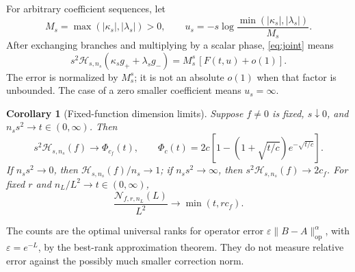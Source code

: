 \documentclass[11pt]{article}
\newtheorem{corollary}[theorem]{Corollary}
\numberwithin{equation}{section}
\newcommand{\op}{\mathrm{op}}
\newcommand{\cH}{\mathcal H}
\newcommand{\cN}{\mathcal N}
\begin{document}
For arbitrary coefficient sequences, let
\[
 M_s=\max(|\kappa_s|,|\lambda_s|)>0,\qquad
 u_s=-s\log\frac{\min(|\kappa_s|,|\lambda_s|)}{M_s}.
\]
After exchanging branches and multiplying by a scalar phase,
\eqref{eq:joint} means
\begin{equation}\label{eq:jointscale}
 s^2\cH_{s,n_s}(\kappa_s g_++\lambda_s g_-)
       =M_s^s\,[F(t,u)+o(1)].
\end{equation}
The error is normalized by $M_s^s$; it is not an absolute $o(1)$
when that factor is unbounded. The case of a zero smaller coefficient
means $u_s=\infty$.

\begin{corollary}[Fixed-function dimension limits]\label{thm:dimension}
Suppose $f\ne0$ is fixed, $s\downarrow0$, and
$n_s s^2\to t\in(0,\infty)$.
Then
\begin{equation}\label{eq:transition}
 s^2\cH_{s,n_s}(f)\longrightarrow
 \Phi_{c_f}(t),\qquad
 \Phi_c(t)=2c\left[1-\left(1+\sqrt{t/c}\right)e^{-\sqrt{t/c}}\right].
\end{equation}
If $n_s s^2\to0$, then $\cH_{s,n_s}(f)/n_s\to1$; if
$n_s s^2\to\infty$, then $s^2\cH_{s,n_s}(f)\to2c_f$.
For fixed $r$ and $n_L/L^2\to t\in(0,\infty)$,
\begin{equation}\label{eq:cappedcount}
 \frac{\cN_{f,r,n_L}(L)}{L^2}\longrightarrow\min(t,r c_f).
\end{equation}
\end{corollary}

The counts are the optimal universal ranks for operator error
$\varepsilon\|B-A\|_\op^\alpha$, with $\varepsilon=e^{-L}$, by the
best-rank approximation theorem. They do not measure relative error
against the possibly much smaller correction norm.
\end{document}

